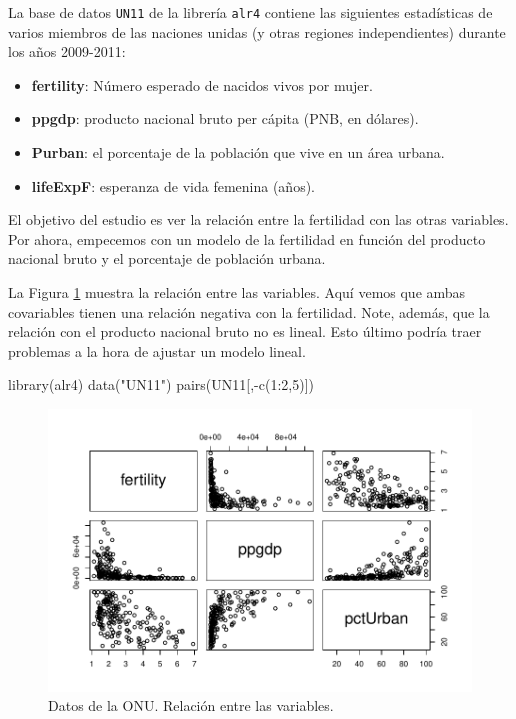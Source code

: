 \documentclass[
]{article}
\newenvironment{Shaded}{\begin{snugshade}}{\end{snugshade}}
\newcommand{\DecValTok}[1]{\textcolor[rgb]{0.00,0.00,0.81}{#1}}
\newcommand{\FunctionTok}[1]{\textcolor[rgb]{0.00,0.00,0.00}{#1}}
\newcommand{\NormalTok}[1]{#1}
\newcommand{\SpecialCharTok}[1]{\textcolor[rgb]{0.00,0.00,0.00}{#1}}
\newcommand{\StringTok}[1]{\textcolor[rgb]{0.31,0.60,0.02}{#1}}
\providecommand{\tightlist}{%
  \setlength{\itemsep}{0pt}\setlength{\parskip}{0pt}}
\begin{document}
La base de datos \texttt{UN11} de la librería \texttt{alr4} contiene las siguientes estadísticas de varios miembros de las naciones unidas (y otras regiones independientes) durante los años 2009-2011:

\begin{itemize}
\tightlist
\item
  \textbf{fertility}: Número esperado de nacidos vivos por mujer.
\item
  \textbf{ppgdp}: producto nacional bruto per cápita (PNB, en dólares).
\item
  \textbf{Purban}: el porcentaje de la población que vive en un área urbana.
\item
  \textbf{lifeExpF}: esperanza de vida femenina (años).
\end{itemize}

El objetivo del estudio es ver la relación entre la fertilidad con las
otras variables. Por ahora, empecemos con un modelo de la fertilidad en función del producto nacional bruto y el porcentaje de población urbana.

La Figura \ref{fig:UNdataFig} muestra la relación entre las variables. Aquí vemos que ambas covariables tienen una relación negativa con la fertilidad. Note, además, que la relación con el producto nacional bruto no es lineal. Esto último podría traer problemas a la hora de ajustar un modelo lineal.

\begin{Shaded}
\begin{Highlighting}[]
\FunctionTok{library}\NormalTok{(alr4)}
\FunctionTok{data}\NormalTok{(}\StringTok{"UN11"}\NormalTok{)}
\FunctionTok{pairs}\NormalTok{(UN11[,}\SpecialCharTok{{-}}\FunctionTok{c}\NormalTok{(}\DecValTok{1}\SpecialCharTok{:}\DecValTok{2}\NormalTok{,}\DecValTok{5}\NormalTok{)])}
\end{Highlighting}
\end{Shaded}

\begin{figure}

{\centering \includegraphics{MLGI_files/figure-latex/UNdataFig-1} 

}

\caption{Datos de la ONU. Relación entre las variables.}\label{fig:UNdataFig}
\end{figure}
\end{document}
